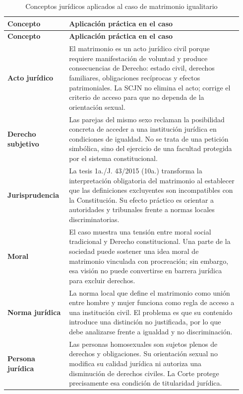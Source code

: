 \documentclass[
	spanish,
	letterpaper, oneside
]{article}
\begin{document}
\begingroup
\small
\setlength{\tabcolsep}{5pt}
\renewcommand{\arraystretch}{1.35}
\begin{longtable}{@{}p{0.24\linewidth}p{0.70\linewidth}@{}}
\caption{Conceptos jurídicos aplicados al caso de matrimonio igualitario}\label{tab:analisis-caso}\\
\toprule
\textbf{Concepto} & \textbf{Aplicación práctica en el caso} \\
\midrule
\endfirsthead
\toprule
\textbf{Concepto} & \textbf{Aplicación práctica en el caso} \\
\midrule
\endhead
\bottomrule
\endlastfoot

\textbf{Acto jurídico} &
El matrimonio es un acto jurídico civil porque requiere manifestación de voluntad y produce consecuencias de Derecho: estado civil, derechos familiares, obligaciones recíprocas y efectos patrimoniales. La SCJN no elimina el acto; corrige el criterio de acceso para que no dependa de la orientación sexual. \\
\midrule

\textbf{Derecho subjetivo} &
Las parejas del mismo sexo reclaman la posibilidad concreta de acceder a una institución jurídica en condiciones de igualdad. No se trata de una petición simbólica, sino del ejercicio de una facultad protegida por el sistema constitucional. \\
\midrule

\textbf{Jurisprudencia} &
La tesis 1a./J. 43/2015 (10a.) transforma la interpretación obligatoria del matrimonio al establecer que las definiciones excluyentes son incompatibles con la Constitución. Su efecto práctico es orientar a autoridades y tribunales frente a normas locales discriminatorias. \\
\midrule

\textbf{Moral} &
El caso muestra una tensión entre moral social tradicional y Derecho constitucional. Una parte de la sociedad puede sostener una idea moral de matrimonio vinculada con procreación; sin embargo, esa visión no puede convertirse en barrera jurídica para excluir derechos. \\
\midrule

\textbf{Norma jurídica} &
La norma local que define el matrimonio como unión entre hombre y mujer funciona como regla de acceso a una institución civil. El problema es que su contenido introduce una distinción no justificada, por lo que debe analizarse frente a igualdad y no discriminación. \\
\midrule

\textbf{Persona jurídica} &
Las personas homosexuales son sujetos plenos de derechos y obligaciones. Su orientación sexual no modifica su calidad jurídica ni autoriza una disminución de derechos civiles. La Corte protege precisamente esa condición de titularidad jurídica. \\
\midrule


\end{longtable}
\end{document}
